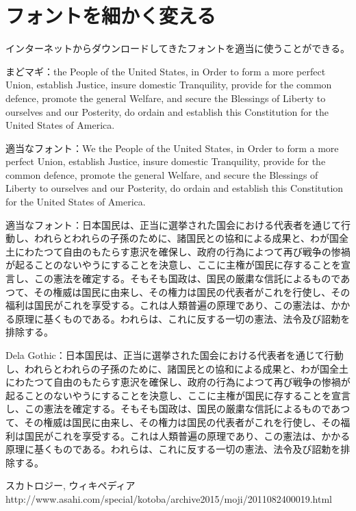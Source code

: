 \documentclass{ltjsarticle}
\begin{document}
\section{フォントを細かく変える}
インターネットからダウンロードしてきたフォントを適当に使うことができる。

まどマギ：{\shoujo the People of the United States, in Order to form a more perfect Union, establish Justice, insure domestic Tranquility, provide for the common defence, promote the general Welfare, and secure the Blessings of Liberty to ourselves and our Posterity, do ordain and establish this Constitution for the United States of America.}

適当なフォント：{\kolker\Huge We the People of the United States, in Order to form a more perfect Union, establish Justice, insure domestic Tranquility, provide for the common defence, promote the general Welfare, and secure the Blessings of Liberty to ourselves and our Posterity, do ordain and establish this Constitution for the United States of America.}

適当なフォント：{\rampart 日本国民は、正当に選挙された国会における代表者を通じて行動し、われらとわれらの子孫のために、諸国民との協和による成果と、わが国全土にわたつて自由のもたらす恵沢を確保し、政府の行為によつて再び戦争の惨禍が起ることのないやうにすることを決意し、ここに主権が国民に存することを宣言し、この憲法を確定する。そもそも国政は、国民の厳粛な信託によるものであつて、その権威は国民に由来し、その権力は国民の代表者がこれを行使し、その福利は国民がこれを享受する。これは人類普遍の原理であり、この憲法は、かかる原理に基くものである。われらは、これに反する一切の憲法、法令及び詔勅を排除する。}

Dela Gothic：{\delagoth 日本国民は、正当に選挙された国会における代表者を通じて行動し、われらとわれらの子孫のために、諸国民との協和による成果と、わが国全土にわたつて自由のもたらす恵沢を確保し、政府の行為によつて再び戦争の惨禍が起ることのないやうにすることを決意し、ここに主権が国民に存することを宣言し、この憲法を確定する。そもそも国政は、国民の厳粛な信託によるものであつて、その権威は国民に由来し、その権力は国民の代表者がこれを行使し、その福利は国民がこれを享受する。これは人類普遍の原理であり、この憲法は、かかる原理に基くものである。われらは、これに反する一切の憲法、法令及び詔勅を排除する。}


\begin{thebibliography}{99}
     スカトロジー, ウィキペディア
     http://www.asahi.com/special/kotoba/archive2015/moji/2011082400019.html
\end{thebibliography}
\end{document}
